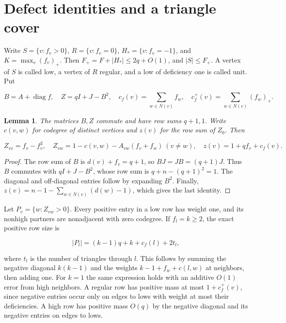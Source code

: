 \documentclass[11pt,reqno]{amsart}
\newtheorem{lemma}[theorem]{Lemma}
\theoremstyle{definition}
\theoremstyle{remark}
\numberwithin{equation}{section}
\DeclareMathOperator{\diag}{diag}
\begin{document}
\section{Defect identities and a triangle cover}\label{sec:defects}

Write \(S=\{v:f_v>0\}\), \(R=\{v:f_v=0\}\), \(H_*=\{v:f_v=-1\}\), and \(K=\max_v(f_v)_+\). Then \(F_+=F+|H_*|\le2q+O(1)\), and \(|S|\le F_+\). A vertex of \(S\) is called low, a vertex of \(R\) regular, and a low of deficiency one is called unit. Put

\[
B=A+\diag f,\quad Z=qI+J-B^2,\quad
c_f(v)=\sum_{w\in N(v)} f_w,\quad c_f^+(v)=\sum_{w\in N(v)}(f_w)_+ .
\]

\begin{lemma}\label{lem:defects}
The matrices \(B,Z\) commute and have row sums \(q+1,1\). Write \(c(v,w)\) for codegree of distinct vertices and \(z(v)\) for the row sum of \(Z_0\). Then

\begin{equation}\label{eq:defect}
Z_{vv}=f_v-f_v^2,\quad
Z_{vw}=1-c(v,w)-A_{vw}(f_v+f_w)\ (v\ne w),\quad
z(v)=1+qf_v+c_f(v).
\end{equation}

\end{lemma}
\begin{proof}
The row sum of \(B\) is \(d(v)+f_v=q+1\), so \(BJ=JB=(q+1)J\).
Thus \(B\) commutes with \(qI+J-B^2\), whose row sum is
\(q+n-(q+1)^2=1\). The diagonal and off-diagonal entries follow by
expanding \(B^2\). Finally,
\(z(v)=n-1-\sum_{w\in N(v)}(d(w)-1)\), which gives the last identity.
\end{proof}

Let \(P_v=\{w:Z_{vw}>0\}\). Every positive entry in a low row has weight one, and its nonhigh partners are nonadjacent with zero codegree. If \(f_l=k\ge2\), the exact positive row size is

\begin{equation}\label{eq:positive-size}
|P_l|=(k-1)q+k+c_f(l)+2t_l ,
\end{equation}

where \(t_l\) is the number of triangles through \(l\). This follows by summing the negative diagonal \(k(k-1)\) and the weights \(k-1+f_w+c(l,w)\) at neighbors, then adding one. For \(k=1\) the same expression holds with an additive \(O(1)\) error from high neighbors. A regular row has positive mass at most \(1+c_f^+(v)\), since negative entries occur only on edges to lows with weight at most their deficiencies. A high row has positive mass \(O(q)\) by the negative diagonal and its negative entries on edges to lows.
\end{document}
